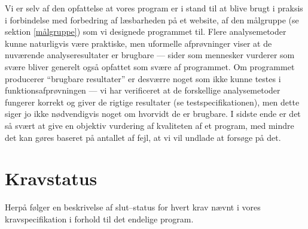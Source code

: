\documentclass[a4paper,oneside]{memoir}
\begin{document}
Vi er selv af den opfattelse at vores program er i stand til at blive
brugt i praksis i forbindelse med forbedring af læsbarheden på et
website, af den målgruppe (se sektion \ref{målgruppe}) som vi
designede programmet til. Flere analysemetoder kunne naturligvis være
praktiske, men uformelle afprøvninger viser at de nuværende
analyseresultater er brugbare --- sider som mennesker vurderer som
svære bliver generelt også opfattet som svære af programmet. Om
programmet producerer ``brugbare resultater'' er desværre noget som
ikke kunne testes i funktionsafprøvningen --- vi har verificeret at de
forskellige analysemetoder fungerer korrekt og giver de rigtige
resultater (se testspecifikationen), men dette siger jo ikke
nødvendigvis noget om hvorvidt de er brugbare. I sidste ende er det så
svært at give en objektiv vurdering af kvaliteten af et program, med
mindre det kan gøres baseret på antallet af fejl, at vi vil undlade at
forsøge på det.

\section{Kravstatus}
\label{kravstatus}
Herpå følger en beskrivelse af slut--status for hvert krav nævnt i
vores kravspecifikation i forhold til det endelige program.
\end{document}
